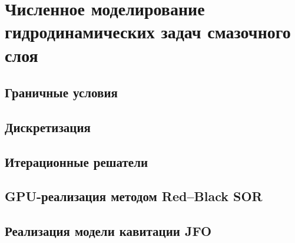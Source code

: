 \chapter{Численное моделирование гидродинамических задач смазочного слоя}

\section{Граничные условия}


\FloatBarrier
\section{Дискретизация}


\FloatBarrier
\section{Итерационные решатели}


\FloatBarrier
\section{GPU-реализация методом Red--Black SOR}


\FloatBarrier
\section{Реализация модели кавитации JFO}


\FloatBarrier

